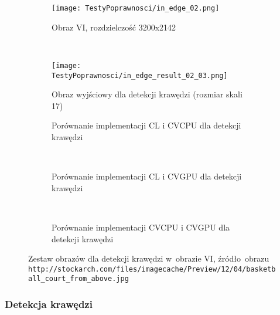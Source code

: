 \begin{figure}[H]

\begin{center}
\begin{subfigure}[t]{0.3\textwidth}
\texttt{[image: TestyPoprawnosci/in\_edge\_02.png]}
\caption{Obraz VI, rozdzielczość 3200x2142}
\label{fig:valEdge02}
\end{subfigure}
~
\begin{subfigure}[t]{0.3\textwidth}
\texttt{[image: TestyPoprawnosci/in\_edge\_result\_02\_03.png]}
\caption{Obraz wyjściowy dla detekcji krawędzi (rozmiar skali 17)}
\label{fig:valEdgeResult02}
\end{subfigure}
\end{center}

\begin{subfigure}[t]{0.3\textwidth}
	\centering
	\setlength\fboxsep{0pt}
	\setlength\fboxrule{0.5pt}
	\caption{Porównanie implementacji CL i CVCPU dla detekcji krawędzi}
	\label{fig:valEdge2CLCVCPU}
\end{subfigure}
~
\begin{subfigure}[t]{0.3\textwidth}
	\centering
	\setlength\fboxsep{0pt}
	\setlength\fboxrule{0.5pt}
	\caption{Porównanie implementacji CL i CVGPU dla detekcji krawędzi}
	\label{fig:valEdge2CLCVGPU}
\end{subfigure}
~
\begin{subfigure}[t]{0.3\textwidth}
	\centering
	\setlength\fboxsep{0pt}
	\setlength\fboxrule{0.5pt}
	\caption{Porównanie implementacji CVCPU i CVGPU dla detekcji krawędzi}
	\label{fig:valEdge2CVCPUCVGPU}                 
\end{subfigure}
\caption{Zestaw obrazów dla detekcji krawędzi w~obrazie VI, \tiny{źródło~obrazu \texttt{http://stockarch.com/files/imagecache/Preview/12/04/basketball\_court\_from\_above.jpg}}}

\label{fig:valEdge2}
\end{figure}

\subsubsection{Detekcja krawędzi}
\label{subsubsec:krawedzieRysunki}

